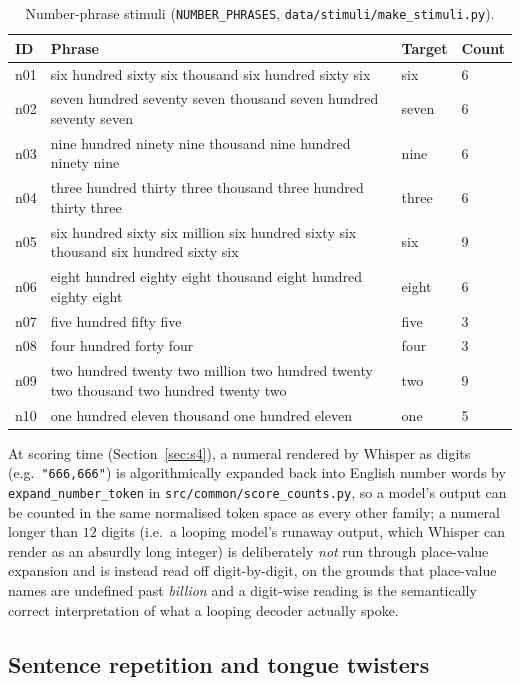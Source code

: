 \documentclass[11pt]{article}
\begin{document}
\begin{table}[h]
\centering
\caption{Number-phrase stimuli (\texttt{NUMBER\_PHRASES},
\texttt{data/stimuli/make\_stimuli.py}).}
\label{tab:numbers}
\small
\begin{tabular}{@{}lp{7.8cm}ll@{}}
\toprule
ID & Phrase & Target & Count \\
\midrule
n01 & six hundred sixty six thousand six hundred sixty six & six & 6 \\
n02 & seven hundred seventy seven thousand seven hundred seventy seven & seven & 6 \\
n03 & nine hundred ninety nine thousand nine hundred ninety nine & nine & 6 \\
n04 & three hundred thirty three thousand three hundred thirty three & three & 6 \\
n05 & six hundred sixty six million six hundred sixty six thousand six hundred sixty six & six & 9 \\
n06 & eight hundred eighty eight thousand eight hundred eighty eight & eight & 6 \\
n07 & five hundred fifty five & five & 3 \\
n08 & four hundred forty four & four & 3 \\
n09 & two hundred twenty two million two hundred twenty two thousand two hundred twenty two & two & 9 \\
n10 & one hundred eleven thousand one hundred eleven & one & 5 \\
\bottomrule
\end{tabular}
\end{table}

At scoring time (Section~\ref{sec:s4}), a numeral rendered by Whisper as
digits (e.g.\ \texttt{"666,666"}) is algorithmically expanded back into
English number words by \texttt{expand\_number\_token} in
\texttt{src/common/score\_counts.py}, so a model's output can be counted in
the same normalised token space as every other family; a numeral longer than
$12$ digits (i.e.\ a looping model's runaway output, which Whisper can render
as an absurdly long integer) is deliberately \emph{not} run through
place-value expansion and is instead read off digit-by-digit, on the grounds
that place-value names are undefined past \emph{billion} and a digit-wise
reading is the semantically correct interpretation of what a looping decoder
actually spoke.

\subsection{Sentence repetition and tongue twisters}
\end{document}
